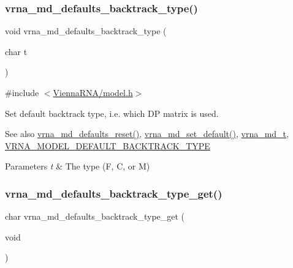 \subsubsection{\texorpdfstring{vrna\_md\_defaults\_backtrack\_type()}{vrna\_md\_defaults\_backtrack\_type()}}
{\footnotesize\ttfamily void vrna\+\_\+md\+\_\+defaults\+\_\+backtrack\+\_\+type (\begin{DoxyParamCaption}\item[{char}]{t }\end{DoxyParamCaption})}



{\ttfamily \#include $<$\mbox{\hyperlink{model_8h}{Vienna\+R\+N\+A/model.\+h}}$>$}



Set default backtrack type, i.\+e. which DP matrix is used. 

\begin{DoxySeeAlso}{See also}
\mbox{\hyperlink{group__model__details_ga70834424cf804d149937de89f80ceb45}{vrna\+\_\+md\+\_\+defaults\+\_\+reset()}}, \mbox{\hyperlink{group__model__details_ga8ac6ff84936282436f822644bf841f66}{vrna\+\_\+md\+\_\+set\+\_\+default()}}, \mbox{\hyperlink{group__model__details_ga1f8a10e12a0a1915f2a4eff0b28ea17c}{vrna\+\_\+md\+\_\+t}}, \mbox{\hyperlink{group__model__details_gad0e81fcaca53c4a826c68e0796de2afb}{V\+R\+N\+A\+\_\+\+M\+O\+D\+E\+L\+\_\+\+D\+E\+F\+A\+U\+L\+T\+\_\+\+B\+A\+C\+K\+T\+R\+A\+C\+K\+\_\+\+T\+Y\+PE}} 
\end{DoxySeeAlso}

\begin{DoxyParams}{Parameters}
{\em t} & The type (\textquotesingle{}F\textquotesingle{}, \textquotesingle{}C\textquotesingle{}, or \textquotesingle{}M\textquotesingle{}) \\
\hline
\end{DoxyParams}
\mbox{\label{group__model__details_ga1425b4ebd0e034dead66d79becd64143}} 
\subsubsection{\texorpdfstring{vrna\_md\_defaults\_backtrack\_type\_get()}{vrna\_md\_defaults\_backtrack\_type\_get()}}
{\footnotesize\ttfamily char vrna\+\_\+md\+\_\+defaults\+\_\+backtrack\+\_\+type\+\_\+get (\begin{DoxyParamCaption}\item[{void}]{ }\end{DoxyParamCaption})}



